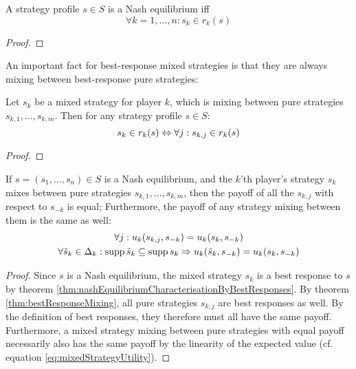 \documentclass[a4paper]{scrreprt}
\begin{document}
    \begin{thm}
        A strategy profile $s \in S$ is a Nash equilibrium iff 
        \[
            \forall k = 1, \dots, n: s_k \in r_k(s)
        \]
        \label{thm:nashEquilibriumCharacterisationByBestResponses}
    \end{thm}
    \begin{proof}
    \end{proof}

    An important fact for best-response mixed strategies is that they are always mixing between best-response pure strategies:

    \begin{thm}
        Let $s_k$ be a mixed strategy for player $k$, which is mixing between pure strategies $s_{k,1}, \dots, s_{k,m}$.
        Then for any strategy profile $s \in S$:
        \[
            s_k \in r_k(s) \Leftrightarrow \forall j: s_{k, j} \in r_k(s)
        \]
        \label{thm:bestResponseMixing}
    \end{thm}
    \begin{proof}
    \end{proof}

    \begin{cor}
        If $s = (s_1, \dots, s_n) \in S$ is a Nash equilibrium, and the $k$'th player's strategy $s_k$
        mixes between pure strategies $s_{k,1}, \dots, s_{k,m}$, then the payoff of all the $s_{k,j}$ with respect to $s_{-k}$ is equal;
        Furthermore, the payoff of any strategy mixing between them is the same as well:
        \begin{gather}
            \forall j: u_k(s_{k,j}, s_{-k}) = u_k(s_k, s_{-k}) \\
            \forall \tilde{s}_k \in \Delta_k: \operatorname{supp} \tilde{s}_k \subseteq \operatorname{supp} s_k \Rightarrow u_k(\tilde{s}_k, s_{-k}) = u_k(s_k, s_{-k})
        \end{gather}
        \label{cor:equilibriumStrategiesSupportHaveEqualPayoffs}
    \end{cor}
    \begin{proof}
        Since $s$ is a Nash equilibrium, the mixed strategy $s_k$ is a best response to $s$ by theorem \ref{thm:nashEquilibriumCharacterisationByBestResponses}.
        By theorem \ref{thm:bestResponseMixing}, all pure strategies $s_{k, j}$ are best responses as well.
        By the definition of best responses, they therefore must all have the same payoff.
        Furthermore, a mixed strategy mixing between pure strategies with equal payoff necessarily also has the same payoff by the linearity of the expected value (cf. equation \eqref{eq:mixedStrategyUtility}).
    \end{proof}
    
\end{document}
